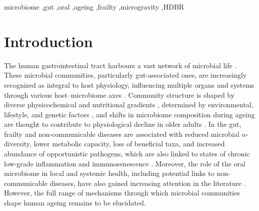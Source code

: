 \documentclass[preprint,12pt,authoryear]{elsarticle}
\begin{document}
\begin{frontmatter}
\begin{keyword}
microbiome \sep gut \sep oral \sep ageing \sep frailty \sep microgravity \sep HDBR
\end{keyword}

\end{frontmatter}
\linenumbers

\section{Introduction}
\label{sec1}

    The human gastrointestinal tract harbours a vast network of microbial life \citep{ruanHealthyHumanGastrointestinal2020}. These microbial communities, particularly gut-associated ones, are increasingly recognized as integral to host physiology, influencing multiple organs and systems through various host–microbiome axes \citep{choHumanMicrobiomeInterface2012, martinBrainGutMicrobiomeAxis2018, ticinesiExerciseImmuneSystem2019, tripathiGutLiverAxis2018, chenMicrobiomeMetabolomeReveals2019, hydeMetagenomicAnalysisNitrateReducing2014}. Community structure is shaped by diverse physicochemical and nutritional gradients \citep{mccallumGutMicrobiotaIts2024, bakerOralMicrobiomeDiversity2023}, determined by environmental, lifestyle, and genetic factors \citep{yatsunenkoHumanGutMicrobiome2012, belstromBacterialProfilesSaliva2014}, and shifts in microbiome composition during ageing are thought to contribute to physiological decline in older adults \citep{gomaaHumanGutMicrobiota2020, jacksonSignaturesEarlyFrailty2016, declercqOralMicrobialSignatures2024}. In the gut, frailty and non-communicable diseases are associated with reduced microbial $\alpha$-diversity, lower metabolic capacity, loss of beneficial taxa, and increased abundance of opportunistic pathogens, which are also linked to states of chronic low-grade inflammation and immunosenescence \citep{ferrucciInflammageingChronicInflammation2018, otooleMicrobiomeHealthInteractions2018, rampelliFunctionalMetagenomicProfiling2013, ghoshGutMicrobiomeModulator2022, rehmanRoleGutMicrobiota2012}. Moreover, the role of the oral microbiome in local and systemic health, including potential links to non-communicable diseases, have also gained increasing attention in the literature \citep{declercqOralMicrobialSignatures2024, scannapiecoOralInflammationInfection2016, heOralMicrobiomeDiversity2015}. However, the full range of mechanisms through which microbial communities shape human ageing remains to be elucidated.
    
\end{document}
